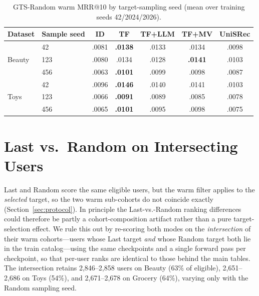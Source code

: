 \documentclass[sigconf,natbib=true,anonymous]{acmart}
\begin{document}
\begin{table}[h]
\centering
\caption{GTS-Random warm MRR@10 by target-sampling seed (mean over training seeds 42/2024/2026).}
\label{tab:random-seeds}
\small
\setlength{\tabcolsep}{3pt}
\begin{tabular}{@{}llccccc@{}}
\toprule
Dataset & Sample seed & ID & TF & TF+LLM & TF+MV & UniSRec \\
\midrule
\multirow{3}{*}{Beauty}
 & 42    & .0081 & \textbf{.0138} & .0133 & .0134 & .0098 \\
 & 123   & .0080 & .0134 & .0128 & \textbf{.0141} & .0103 \\
 & 456   & .0063 & \textbf{.0101} & .0099 & .0098 & .0087 \\
\midrule
\multirow{3}{*}{Toys}
 & 42    & .0096 & \textbf{.0146} & .0140 & .0141 & .0103 \\
 & 123   & .0066 & \textbf{.0091} & .0089 & .0085 & .0078 \\
 & 456   & .0065 & \textbf{.0101} & .0095 & .0098 & .0075 \\
\bottomrule
\end{tabular}
\end{table}

\section{Last vs.\ Random on Intersecting Users}
\label{app:intersection}

Last and Random score the same eligible users, but the warm filter applies to the \emph{selected} target, so the two warm sub-cohorts do not coincide exactly (Section~\ref{sec:protocol}).
In principle the Last-vs.-Random ranking differences could therefore be partly a cohort-composition artifact rather than a pure target-selection effect.
We rule this out by re-scoring both modes on the \emph{intersection} of their warm cohorts---users whose Last target \emph{and} whose Random target both lie in the train catalog---using the same checkpoints and a single forward pass per checkpoint, so that per-user ranks are identical to those behind the main tables.
The intersection retains 2{,}846--2{,}858 users on Beauty (63\% of eligible), 2{,}651--2{,}686 on Toys (54\%), and 2{,}671--2{,}678 on Grocery (64\%), varying only with the Random sampling seed.
\end{document}
